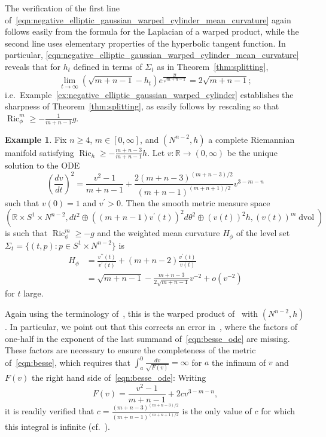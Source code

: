 \documentclass{amsart}
\theoremstyle{definition}
\newtheorem{example}[thm]{Example}
\theoremstyle{remark}
\numberwithin{equation}{section}
\begin{document}
The verification of the first line of~\eqref{eqn:negative_elliptic_gaussian_warped_cylinder_mean_curvature} again follows easily from the formula for the Laplacian of a warped product, while the second line uses elementary properties of the hyperbolic tangent function.  In particular, \eqref{eqn:negative_elliptic_gaussian_warped_cylinder_mean_curvature} reveals that for $h_t$ defined in terms of $\Sigma_t$ as in Theorem~\ref{thm:splitting},
\[ \lim_{t\to\infty} \left(\sqrt{m+n-1}-h_t\right)e^{\frac{2t}{\sqrt{m+n-1}}} = 2\sqrt{m+n-1} ; \]
i.e.\ Example~\ref{ex:negative_elliptic_gaussian_warped_cylinder} establishes the sharpness of Theorem~\ref{thm:splitting}, as easily follows by rescaling so that $\operatorname{Ric}_\phi^m\geq-\frac{1}{m+n-1}g$.

\begin{example}
\label{ex:besse}
Fix $n\geq 4$, $m\in[0,\infty]$, and $(N^{n-2},h)$ a complete Riemannian manifold satisfying $\operatorname{Ric}_h\geq-\frac{m+n-3}{m+n-1}h$.  Let $v\colon{\mathbb{R}}\to(0,\infty)$ be the unique solution to the ODE
\begin{equation}
\label{eqn:besse_ode}
\left(\frac{dv}{dt}\right)^2 = \frac{v^2-1}{m+n-1} + \frac{2(m+n-3)^{(m+n-3)/2}}{(m+n-1)^{(m+n+1)/2}}v^{3-m-n}
\end{equation}
such that $v(0)=1$ and $v^\prime>0$.  Then the smooth metric measure space
\begin{equation}
\label{eqn:besse}
\left( {\mathbb{R}}\times S^1\times N^{n-2}, dt^2\oplus\left((m+n-1)v^\prime(t)\right)^2d\theta^2\oplus \left(v(t)\right)^2 h, \left(v(t)\right)^m\operatorname{dvol}\right)
\end{equation}
is such that $\operatorname{Ric}_\phi^m\geq-g$ and the weighted mean curvature $H_\phi$ of the level set $\Sigma_t=\{(t,p)\colon p\in S^1\times N^{n-2}\}$ is
\begin{equation}
\label{eqn:besse_mean_curvature}
\begin{split}
H_\phi & = \frac{v^{\prime\prime}(t)}{v^\prime(t)} + (m+n-2)\frac{v^\prime(t)}{v(t)} \\
& = \sqrt{m+n-1} - \frac{m+n-3}{2\sqrt{m+n-1}}v^{-2} + o(v^{-2})
\end{split}
\end{equation}
for $t$ large.
\end{example}

Again using the terminology of~\cite{Case2010a}, this is the warped product of~\cite[Example~9.118(c)]{Besse} with $(N^{n-2},h)$.  In particular, we point out that this corrects an error in~\cite{Besse}, where the factors of one-half in the exponent of the last summand of~\eqref{eqn:besse_ode} are missing.  These factors are necessary to ensure the completeness of the metric of~\eqref{eqn:besse}, which requires that $\int_a^0\frac{dv}{\sqrt{F(v)}}=\infty$ for $a$ the infimum of $v$ and $F(v)$ the right hand side of~\eqref{eqn:besse_ode}: Writing
\[ F(v) = \frac{v^2-1}{m+n-1} + 2cv^{3-m-n}, \]
it is readily verified that $c=\frac{(m+n-3)^{(m+n-3)/2}}{(m+n-1)^{(m+n+1)/2}}$ is the only value of $c$ for which this integral is infinite (cf.\ \cite[Appendix~A]{HePetersenWylie2010}).
\end{document}

